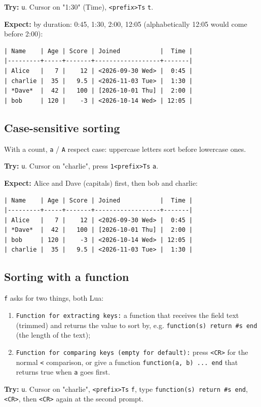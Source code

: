 \textbf{Try:} \texttt{u}. Cursor on "1:30" (Time), \texttt{<prefix>Ts} \texttt{t}.

\textbf{Expect:} by duration: 0:45, 1:30, 2:00, 12:05 (alphabetically 12:05 would
come before 2:00):
\begin{verbatim}
| Name    | Age | Score | Joined           |  Time |
|---------+-----+-------+------------------+-------|
| Alice   |   7 |    12 | <2026-09-30 Wed> |  0:45 |
| charlie |  35 |   9.5 | <2026-11-03 Tue> |  1:30 |
| *Dave*  |  42 |   100 | [2026-10-01 Thu] |  2:00 |
| bob     | 120 |    -3 | <2026-10-14 Wed> | 12:05 |
\end{verbatim}
\subsection{Case-sensitive sorting}
\label{sec:orgaa3a7e6}
With a count, \texttt{a} / \texttt{A} respect case: uppercase letters sort before
lowercase ones.

\textbf{Try:} \texttt{u}. Cursor on "charlie", press \texttt{1<prefix>Ts} \texttt{a}.

\textbf{Expect:} Alice and Dave (capitals) first, then bob and charlie:
\begin{verbatim}
| Name    | Age | Score | Joined           |  Time |
|---------+-----+-------+------------------+-------|
| Alice   |   7 |    12 | <2026-09-30 Wed> |  0:45 |
| *Dave*  |  42 |   100 | [2026-10-01 Thu] |  2:00 |
| bob     | 120 |    -3 | <2026-10-14 Wed> | 12:05 |
| charlie |  35 |   9.5 | <2026-11-03 Tue> |  1:30 |
\end{verbatim}
\subsection{Sorting with a function}
\label{sec:org0f736aa}
\texttt{f} asks for two things, both Lua:

\begin{enumerate}
\item \texttt{Function for extracting keys:} a function that receives the field text
(trimmed) and returns the value to sort by, e.g.
\texttt{function(s) return \#s end} (the length of the text);
\item \texttt{Function for comparing keys (empty for default):} press \texttt{<CR>} for the
normal \texttt{<} comparison, or give a function \texttt{function(a, b) ... end} that
returns true when \texttt{a} goes first.
\end{enumerate}

\textbf{Try:} \texttt{u}. Cursor on "charlie", \texttt{<prefix>Ts} \texttt{f}, type
\texttt{function(s) return \#s end}, \texttt{<CR>}, then \texttt{<CR>} again at the second prompt.

